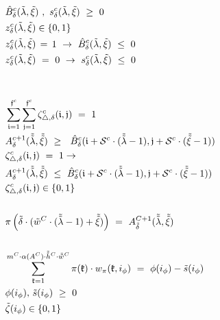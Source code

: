 \documentclass{article}
\begin{document}
\begin{align}
& \hat{B}_\delta^c (\tilde{\lambda},\tilde{\xi}) \ , \ s_\delta^c(\tilde{\lambda},\tilde{\xi}) \ \geq \ 0 \label{const_relu_86} \\
&z_\delta^c(\tilde{\lambda},\tilde{\xi}) \in \{0, 1 \} \label{const_relu_87}\\
& z_\delta^c (\tilde{\lambda},\tilde{\xi}) \, = \, 1 \ \to \ \hat{B}_\delta^c (\tilde{\lambda},\tilde{\xi}) \  \leq \ 0 \label{const_relu_88} \\
& z_\delta^c (\tilde{\lambda},\tilde{\xi}) \ = \ 0 \ \to \ s_\delta^c (\tilde{\lambda},\tilde{\xi}) \ \leq \ 0 \label{const_relu_89} \\
\notag \\
\notag \\
&\sum_{\mathfrak{i} =1}^{\mathfrak{f}^c} \sum_{\mathfrak{j}=1}^{\mathfrak{f}^c} \zeta_{\triangle, \delta}^c(\mathfrak{i},\mathfrak{j}) \ = \ 1 \label{const_pool_90} \\
& A_\delta^{c+1}(\tilde{\tilde{\lambda}}, \tilde{\tilde{\xi}}) \ \geq \ \ \hat{B}_\delta^c(\mathfrak{i}+\mathcal{S}^c\cdot(\tilde{\tilde{\lambda}} - 1),\mathfrak{j}+\mathcal{S}^c \cdot( \tilde{\tilde{\xi}} - 1)) \label{const_pool_91}  \\
&  \zeta_{\triangle, \delta}^c(\mathfrak{i},\mathfrak{j}) \ = \ 1 \to \notag \\
& A_\delta^{c+1}(\tilde{\tilde{\lambda}}, \tilde{\tilde{\xi}}) \ \leq \ \hat{B}_\delta^c(\mathfrak{i}+\mathcal{S}^c\cdot(\tilde{\tilde{\lambda}} - 1),\mathfrak{j}+\mathcal{S}^c \cdot( \tilde{\tilde{\xi}} - 1)) \label{const_pool_92}  \\
& \zeta_{\triangle, \delta}^c(\mathfrak{i},\mathfrak{j}) \in \{0, 1\} \label{const_pool_93}  \\
\notag \\
&\pi \left(\tilde{\delta}\cdot( \tilde{w}^{C} \cdot (\tilde{\tilde{\lambda}}-1) + \tilde{\tilde{\xi}} )\right) \ = \ A_{\tilde{\delta}}^{C+1}(\tilde{\tilde{\lambda}}, \tilde{\tilde{\xi}}) \label{const_flatten_94} \\
\notag \\
&\sum_{\mathfrak{k}=1}^{m^{C}\cdot \alpha(A^{C}) \cdot \tilde{\tilde{h}}^{C} \cdot \tilde{\tilde{w}}^{C}} \pi(\mathfrak{k}) \cdot w_\pi (\mathfrak{k}, i_\phi) \ = \ \phi(i_\phi) - \tilde{s}(i_\phi) \label{const_fullyconnect_relu_95} \\
& \phi(i_\phi), \, \tilde{s}(i_\phi) \ \geq \ 0 \label{const_fullyconnect_relu_96}\\
& \tilde{\zeta}(i_\phi) \in \{ 0,1 \} \label{const_fullyconnect_relu_97}\\

\end{align}
\end{document}
